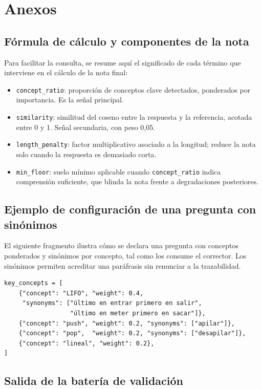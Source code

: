 \appendix
\chapter{Anexos}

\section{Fórmula de cálculo y componentes de la nota}

Para facilitar la consulta, se resume aquí el significado de cada término que interviene en el cálculo de la nota final:

\begin{itemize}[leftmargin=1.4em]
  \item \texttt{concept\_ratio}: proporción de conceptos clave detectados, ponderados por importancia. Es la señal principal.
  \item \texttt{similarity}: similitud del coseno entre la respuesta y la referencia, acotada entre 0 y 1. Señal secundaria, con peso 0{,}05.
  \item \texttt{length\_penalty}: factor multiplicativo asociado a la longitud; reduce la nota solo cuando la respuesta es demasiado corta.
  \item \texttt{min\_floor}: suelo mínimo aplicable cuando \texttt{concept\_ratio} indica comprensión suficiente, que blinda la nota frente a degradaciones posteriores.
\end{itemize}

\section{Ejemplo de configuración de una pregunta con sinónimos}

El siguiente fragmento ilustra cómo se declara una pregunta con conceptos ponderados y sinónimos por concepto, tal como los consume el corrector. Los sinónimos permiten acreditar una paráfrasis sin renunciar a la trazabilidad.

\begin{lstlisting}[style=pycode]
key_concepts = [
    {"concept": "LIFO", "weight": 0.4,
     "synonyms": ["último en entrar primero en salir",
                  "último en meter primero en sacar"]},
    {"concept": "push", "weight": 0.2, "synonyms": ["apilar"]},
    {"concept": "pop",  "weight": 0.2, "synonyms": ["desapilar"]},
    {"concept": "lineal", "weight": 0.2},
]
\end{lstlisting}

\section{Salida de la batería de validación}

